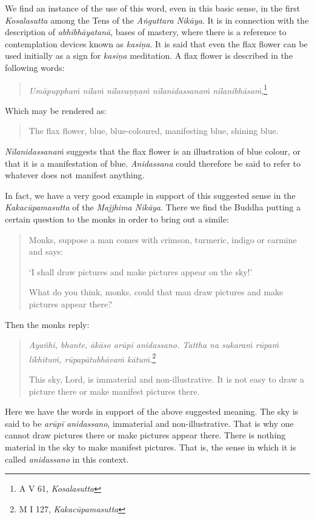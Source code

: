 We find an instance of the use of this word, even in this basic sense, in the first \emph{Kosalasutta} among the Tens of the \emph{Aṅguttara Nikāya}. It is in connection with the description of \emph{abhibhāyatanā}, bases of mastery, where there is a reference to contemplation devices known as \emph{kasiṇa}. It is said that even the flax flower can be used initially as a sign for \emph{kasiṇa} meditation. A flax flower is described in the following words:

\begin{quote}
\emph{Umāpupphaṁ nīlaṁ nīlavaṇṇaṁ nīlanidassanaṁ nīlanibhāsaṁ},\footnote{A V 61, \emph{Kosalasutta}}
\end{quote}

Which may be rendered as:

\begin{quote}
The flax flower, blue, blue-coloured, manifesting blue, shining blue.
\end{quote}

\emph{Nīlanidassanaṁ} suggests that the flax flower is an illustration of blue colour, or that it is a manifestation of blue. \emph{Anidassana} could therefore be said to refer to whatever does not manifest anything.

In fact, we have a very good example in support of this suggested sense in the \emph{Kakacūpamasutta} of the \emph{Majjhima Nikāya}. There we find the Buddha putting a certain question to the monks in order to bring out a simile:

\begin{quote}
Monks, suppose a man comes with crimson, turmeric, indigo or carmine and says:

`I shall draw pictures and make pictures appear on the sky!'

What do you think, monks, could that man draw pictures and make pictures appear there?
\end{quote}

Then the monks reply:

\begin{quote}
\emph{Ayañhi, bhante, ākāso arūpī anidassano. Tattha na sukaraṁ rūpaṁ likhituṁ, rūpapātubhāvaṁ kātuṁ}.\footnote{M I 127, \emph{Kakacūpamasutta}}

This sky, Lord, is immaterial and non-illustrative. It is not easy to draw a picture there or make manifest pictures there.
\end{quote}

Here we have the words in support of the above suggested meaning. The sky is said to be \emph{arūpī anidassano}, immaterial and non-illustrative. That is why one cannot draw pictures there or make pictures appear there. There is nothing material in the sky to make manifest pictures. That is, the sense in which it is called \emph{anidassano} in this context.

